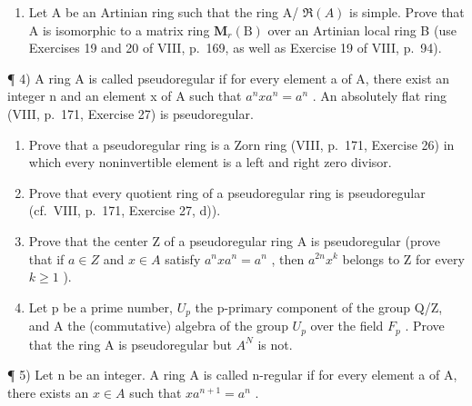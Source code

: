 \begin{enumerate}
\def\labelenumi{\arabic{enumi})}
\setcounter{enumi}{2}
\tightlist
\item
  Let A be an Artinian ring such that the ring A/ \(\Re(A)\) is simple. Prove that A is isomorphic to a matrix ring \(\mathbf{M}_{r}(\mathrm{B})\) over an Artinian local ring B (use Exercises 19 and 20 of VIII, p.~169, as well as Exercise 19 of VIII, p.~94).
\end{enumerate}

¶ 4) A ring A is called pseudoregular if for every element a of A, there exist an integer n and an element x of A such that \(a^{n}xa^{n}=a^{n}\) . An absolutely flat ring (VIII, p.~171, Exercise 27) is pseudoregular.

\begin{enumerate}
\def\labelenumi{\alph{enumi})}
\item
  Prove that a pseudoregular ring is a Zorn ring (VIII, p.~171, Exercise 26) in which every noninvertible element is a left and right zero divisor.
\item
  Prove that every quotient ring of a pseudoregular ring is pseudoregular (cf.~VIII, p.~171, Exercise 27, d)).
\item
  Prove that the center Z of a pseudoregular ring A is pseudoregular (prove that if \(a \in Z\) and \(x \in A\) satisfy \(a^{n}xa^{n} = a^{n}\) , then \(a^{2n}x^{k}\) belongs to Z for every \(k \geqslant 1\) ).
\item
  Let p be a prime number, \(U_{p}\) the p-primary component of the group Q/Z, and A the (commutative) algebra of the group \(U_{p}\) over the field \(F_{p}\) . Prove that the ring A is pseudoregular but \(A^{N}\) is not.
\end{enumerate}

¶ 5) Let n be an integer. A ring A is called n-regular if for every element a of A, there exists an \(x \in A\) such that \(xa^{n+1} = a^n\) .

